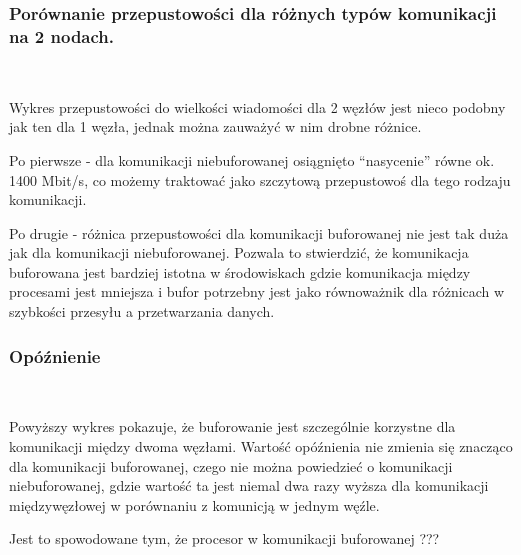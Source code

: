 \documentclass[11pt]{article}
\begin{document}
\hypertarget{poruxf3wnanie-przepustowoux15bci-dla-ruxf3ux17cnych-typuxf3w-komunikacji-na-2-nodach.}{%
\subsubsection{Porównanie przepustowości dla różnych typów komunikacji
na 2
nodach.}\label{poruxf3wnanie-przepustowoux15bci-dla-ruxf3ux17cnych-typuxf3w-komunikacji-na-2-nodach.}}

    \begin{center}
    \end{center}
    { \hspace*{\fill} \\}
    
    Wykres przepustowości do wielkości wiadomości dla 2 węzłów jest nieco
podobny jak ten dla 1 węzła, jednak można zauważyć w nim drobne różnice.

Po pierwsze - dla komunikacji niebuforowanej osiągnięto ``nasycenie''
równe ok. 1400 Mbit/s, co możemy traktować jako szczytową przepustowoś
dla tego rodzaju komunikacji.

Po drugie - różnica przepustowości dla komunikacji buforowanej nie jest
tak duża jak dla komunikacji niebuforowanej. Pozwala to stwierdzić, że
komunikacja buforowana jest bardziej istotna w środowiskach gdzie
komunikacja między procesami jest mniejsza i bufor potrzebny jest jako
równoważnik dla różnicach w szybkości przesyłu a przetwarzania danych.

\hypertarget{opuxf3ux17anienie}{%
\subsubsection{Opóźnienie}\label{opuxf3ux17anienie}}

    \begin{center}
    \end{center}
    { \hspace*{\fill} \\}
    
    Powyższy wykres pokazuje, że buforowanie jest szczególnie korzystne dla
komunikacji między dwoma węzłami. Wartość opóźnienia nie zmienia się
znacząco dla komunikacji buforowanej, czego nie można powiedzieć o
komunikacji niebuforowanej, gdzie wartość ta jest niemal dwa razy wyższa
dla komunikacji międzywęzłowej w porównaniu z komunicją w jednym węźle.

Jest to spowodowane tym, że procesor w komunikacji buforowanej ???


    
    
    
\end{document}
